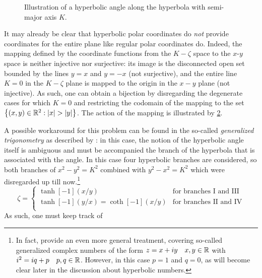 \begin{figure}[ht!]
    \centering
    
    \caption{Illustration of a hyperbolic angle along the hyperbola with semi-major axis $K$.}
    \label{fig:hyperbolic_angle}
\end{figure}
It may already be clear that hyperbolic polar coordinates do \emph{not} provide coordinates for the entire plane like regular polar coordinates do. Indeed, the mapping defined by the coordinate functions from the $K-\zeta$ space to the $x$-$y$ space is neither injective nor surjective: its image is the disconnected open set bounded by the lines $y = x$ and $y = -x$ (not surjective), and the entire line $K = 0$ in the $K-\zeta$ plane is mapped to the origin in the $x-y$ plane (not injective). As such, one can obtain a bijection by disregarding the degenerate cases for which $K = 0$ and restricting the codomain of the mapping to the set $\qty{(x, y) \in \real^2: \abs{x} > \abs{y}}$. The action of the mapping is illustrated by \cref{fig:polar_coords}.
\begin{figure}[ht!]
    \centering
    
    \caption{}
    \label{fig:polar_coords}
\end{figure}

A possible workaround for this problem can be found in the so-called \emph{generalized trigonometry} as described by \citet{Harkin2004}: in this case, the notion of the hyperbolic angle itself is ambiguous and must be accompanied the branch of the hyperbola that is associated with the angle. In this case four hyperbolic branches are considered, so both branches of $x^2 - y^2 = K^2$ combined with $y^2 - x^2 = K^2$ which were disregarded up till now.\footnote{In fact, \citeauthor{Harkin2004} provide an even more general treatment, covering so-called generalized complex numbers of the form $z = x + iy\quad x, y \in \mathbb{R}$ with $i^2 = iq + p\quad p, q \in \mathbb{R}$. However, in this case $p = 1$ and $q = 0$, as will become clear later in the discussion about hyperbolic numbers.}
\begin{equation}
    \zeta = 
    \begin{cases}
        \tanh[-1](x/y) & \text{for branches I and III}\\
        \tanh[-1](y/x) = \coth[-1](x/y) & \text{for branches II and IV}\\
    \end{cases}
\end{equation}
As such, one must keep track of

